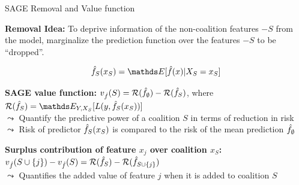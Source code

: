 \documentclass[11pt,compress,t,notes=noshow, aspectratio=169, xcolor=table]{beamer}
\begin{document}
\begin{frame}{SAGE Removal and Value function}
  
 \textbf{Removal Idea:} %
 To deprive information of the non-coalition features $-S$ from the model, marginalize the prediction function over the features $-S$ to be ``dropped''.

$$\fh_S(x_S) = \E[\fh(x) | X_S = x_S]$$



\pause
\lz

\textbf{SAGE value function:}  $v_{\fh}(S) = \risk(\fh_{\emptyset}) - \risk(\fh_{S})$, where $\risk(\fh_{S}) = \E_{Y, X_S}[L(y, \fh_S(x_S))]$\\
$\leadsto$ Quantify the predictive power of a coalition $S$ in terms of reduction in risk \\
$\leadsto$ Risk of predictor $\fh_S(x_S)$ is compared to the risk of the mean prediction $\fh_{\emptyset}$


\pause
\lz

\textbf{Surplus contribution of feature $x_j$ over coalition $x_S$:}  $v_{\fh}(S \cup \{j\}) - v_{\fh}(S) = \risk(\fh_{S})-\risk(\fh_{S \cup \{j\}})$\\
$\leadsto$ Quantifies the added value of feature $j$ when it is added to coalition $S$
\end{frame}
\end{document}
